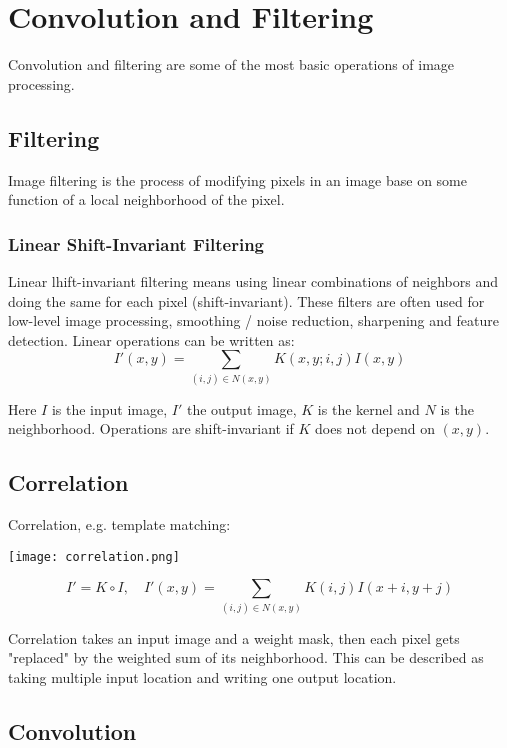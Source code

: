 \section{Convolution and Filtering}

Convolution and filtering are some of the most basic operations of image processing. 


\subsection{Filtering}

Image filtering is the process of modifying pixels in an image base on some function of a local neighborhood of the pixel.

\subsubsection{Linear Shift-Invariant Filtering}

Linear lhift-invariant filtering means using linear combinations of neighbors and doing the same for each pixel (shift-invariant). These filters are often used for low-level image processing, smoothing / noise reduction, sharpening and feature detection. Linear operations can be written as:
$$I'(x,y) = \sum_{(i,j) \in N(x,y)} K(x,y; i, j) I(x,y)$$

Here $I$ is the input image, $I'$ the output image, $K$ is the kernel and $N$ is the neighborhood. Operations are shift-invariant if $K$ does not depend on $(x,y)$.


\subsection{Correlation}

Correlation, e.g. template matching:

\begin{center}
	\texttt{[image: correlation.png]}
\end{center}
$$I' = K \circ I, \quad I'(x,y) = \sum_{(i,j) \in N(x,y)} K(i, j) I(x + i, y + j)$$

Correlation takes an input image and a weight mask, then each pixel gets "replaced" by the weighted sum of its neighborhood. This can be described as taking multiple input location and writing one output location.


\subsection{Convolution}

